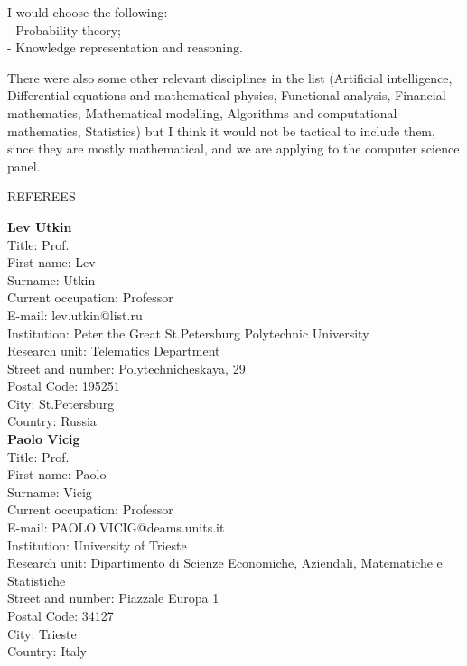 \documentclass[11pt,dvipsnames,usenames,a4paper]{article}
\begin{document}
I would choose the following:\\[5pt]
- Probability theory;\\
- Knowledge representation and reasoning.

There were also some other relevant disciplines in the list (Artificial intelligence, Differential equations and mathematical physics, Functional analysis, Financial mathematics, Mathematical modelling, Algorithms and computational mathematics, Statistics) but I think it would not be tactical to include them, since they are mostly mathematical, and we are applying to the computer science panel.


\vspace{5mm}

\begin{shaded}\centering REFEREES \end{shaded}

\vspace{5pt}

{\bf Lev Utkin}\\
Title: Prof.\\
First name: Lev\\
Surname:  Utkin \\
Current occupation: Professor\\
E-mail: lev.utkin@list.ru\\
Institution: Peter the Great St.Petersburg Polytechnic University\\
Research unit: Telematics Department\\
Street and number: Polytechnicheskaya, 29\\
Postal Code: 195251\\
City: St.Petersburg\\
Country: Russia\\[-7pt]

{\bf Paolo Vicig}\\
Title: Prof.\\
First name: Paolo\\
Surname:  Vicig \\
Current occupation: Professor\\
E-mail: PAOLO.VICIG@deams.units.it\\
Institution: University of Trieste\\
Research unit: Dipartimento di Scienze Economiche, Aziendali, Matematiche e Statistiche\\
Street and number: Piazzale Europa 1\\
Postal Code: 34127\\
City: Trieste\\
Country: Italy\\[-7pt]
\end{document}
